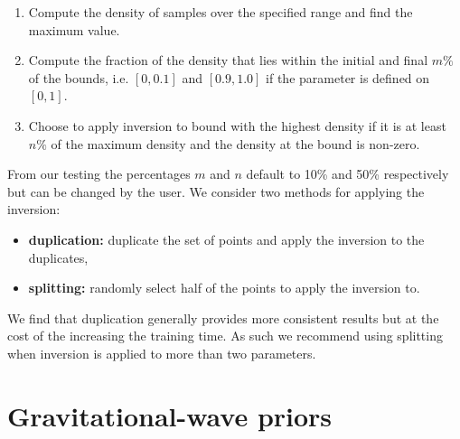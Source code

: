 \documentclass[%
 reprint,
nofootinbib,
 amsmath,amssymb,
 aps,
 prd,
]{revtex4-2}
\begin{document}
\begin{widetext}
\begin{enumerate}
    \item {Compute the density of samples over the specified range and find the maximum value.}
    \item {Compute the fraction of the density that lies within the initial and final $m\%$ of the bounds, i.e. $[0, 0.1]$ and $[0.9, 1.0]$ if the parameter is defined on $[0, 1]$.}
    \item {Choose to apply inversion to bound with the highest density if it is at least $n\%$ of the maximum density and the density at the bound is non-zero.}
\end{enumerate}

From our testing the percentages $m$ and $n$ default to 10\% and 50\% respectively but can be changed by the user. We consider two methods for applying the inversion:

\begin{itemize}
    \item \textbf{duplication:} duplicate the set of points and apply the inversion to the duplicates,
    \item \textbf{splitting:} randomly select half of the points to apply the inversion to.
\end{itemize}

We find that duplication generally provides more consistent results but at the cost of the increasing the training time. As such we recommend using splitting when inversion is applied to more than two parameters.

\section{Gravitational-wave priors}\label{app:priors}


\end{widetext}
\end{document}
